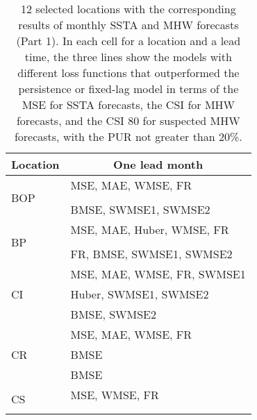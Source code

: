\documentclass[11pt, a4paper]{article}
\begin{document}
\begin{table}[H]
\centering
\scriptsize
\caption{12 selected locations with the corresponding results of monthly SSTA and MHW forecasts (Part 1). In each cell for a location and a lead time, the three lines show the models with different loss functions that outperformed the persistence or fixed-lag model in terms of the MSE for SSTA forecasts, the CSI for MHW forecasts, and the CSI 80 for suspected MHW forecasts, with the PUR not greater than 20\%.}\label{tb:all_results}
\begin{tabular}{ll}
\multicolumn{1}{c}{\textbf{Location}} & \multicolumn{1}{c}{\textbf{One lead month}}     \\ \hline
\multirow{3}{*}{BOP}                  & MSE, MAE, WMSE, FR                              \\
                                      &                                                 \\
                                      & BMSE, SWMSE1, SWMSE2                            \\ \hline
\multirow{3}{*}{BP}                   & MSE, MAE, Huber, WMSE, FR                       \\
                                      &                                                 \\
                                      & FR, BMSE, SWMSE1, SWMSE2                        \\ \hline
\multirow{3}{*}{CI}                   & MSE, MAE, WMSE, FR, SWMSE1                      \\
                                      & Huber, SWMSE1, SWMSE2                           \\
                                      & BMSE, SWMSE2                                    \\ \hline
\multirow{3}{*}{CR}                   & MSE, MAE, WMSE, FR                              \\
                                      & BMSE                                            \\
                                      & BMSE                                            \\ \hline
\multirow{3}{*}{CS}                   & MSE, WMSE, FR                                   \\
                                      &                                                 \\
                                      &                                                 \\ \hline

\end{tabular}
\end{table}
\end{document}
